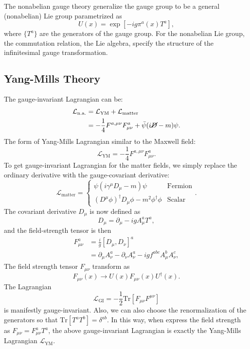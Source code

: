 The nonabelian gauge theory generalize the gauge group to be a general (nonabelian) Lie group parametrized as
\begin{equation}
	U(x) = \exp\left[-i g \pi^a(x) T^a\right],
\end{equation}
where $\{T^a\}$ are the generators of the gauge group.
For the nonabelian Lie group, the commutation relation, the Lie algebra, specify the structure of the infinitesimal gauge transformation.

\subsection{Yang-Mills Theory}
The gauge-invariant Lagrangian can be:
\begin{equation}
\begin{aligned}
	\mathcal L_{\mathrm{n.a.}} &= \mathcal L_{\mathrm{YM}} + \mathcal L_{\mathrm{matter}} \\
	&= -\frac{1}{4} F^{a,\mu\nu} F^a_{\mu\nu} + \bar\psi(i\cancel D-m)\psi.
\end{aligned}
\end{equation}
The form of Yang-Mills Lagrangian similar to the Maxwell field:
\begin{equation}
	\mathcal L_{\mathrm{YM}} = -\frac{1}{4} F^{a,\mu\nu} F^a_{\mu\nu}.
\end{equation}
To get gauge-invariant Lagrangian for the matter fields, we simply replace the ordinary derivative with the gauge-covariant derivative:
\begin{equation}
	\mathcal L_{\mathrm{matter}} = \begin{cases}
		\psi(i\gamma^\mu D_\mu - m)\psi & \text{Fermion} \\
		(D^\mu \phi)^\dagger D_\mu \phi - m^2 \phi^\dagger \phi & \text{Scalar}
	\end{cases}.
\end{equation}
The covariant derivative $D_\mu$ is now defined as
\begin{equation}
	D_\mu = \partial_\mu - i g A_\mu^a T^a,
\end{equation}
and the field-strength tensor is then
\begin{equation}
\begin{aligned}
	F^a_{\mu\nu} &= \frac{i}{g}[D_\mu, D_\nu]^a \\
	&= \partial_\mu A_\nu^a - \partial_\nu A_\nu^a -ig f^{abc} A^b_\mu A^c_\nu,
\end{aligned}
\end{equation}
The field strength tensor $F_{\mu\nu}$ transform as
\begin{equation}
	F_{\mu\nu}(x) \rightarrow U(x) F_{\mu\nu}(x) U^\dagger(x).
\end{equation}
The Lagrangian 
\begin{equation*}
	\mathcal L_{\mathrm{GI}} = -\frac{1}{2} \mathrm{Tr}\left[F_{\mu\nu} F^{\mu\nu}\right]
\end{equation*}
is manifestly gauge-invariant.
Also, we can also choose the renormalization of the generators so that $\mathrm{Tr}[T^aT^b] = \delta^{ab}$.
In this way, when express the field strength as $F_{\mu\nu} = F_{\mu\nu}^a T^a$, the above gauge-invariant Lagrangian is exactly the Yang-Mills Lagrangian $\mathcal L_{\mathrm{YM}}$.

